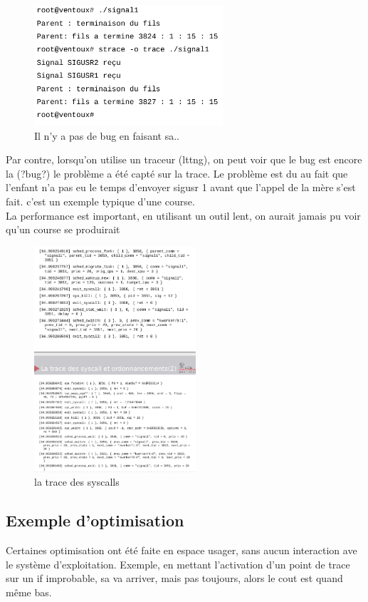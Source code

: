 \documentclass[oneside]{book}
\begin{document}
\begin{figure}[!ht]
\centering
\includegraphics[width = 7cm]{strace.png}
\caption{Il n'y a pas de bug en faisant sa..}
\end{figure}
Par contre, lorsqu'on utilise un traceur (lttng), on peut voir que le bug est encore la (?bug?) le problème a été capté sur la trace. Le problème est du au fait que l'enfant n'a pas eu le temps d'envoyer sigusr 1 avant que l'appel de la mère s'est fait. c'est un exemple typique d'une course.\\

La performance est important, en utilisant un outil lent, on aurait jamais pu voir qu'un course se produirait\\

\begin{figure}[!ht]
\centering
\includegraphics[width = 6cm]{strace_performance.png}
\caption{la trace des syscalls}
\end{figure}

\subsection{Exemple d'optimisation}
Certaines optimisation ont été faite en espace usager, sans aucun interaction ave le système d'exploitation. Exemple, en mettant l'activation d'un point de trace sur un if improbable, sa va arriver, mais pas toujours, alors le cout est quand même bas. \\
\end{document}
